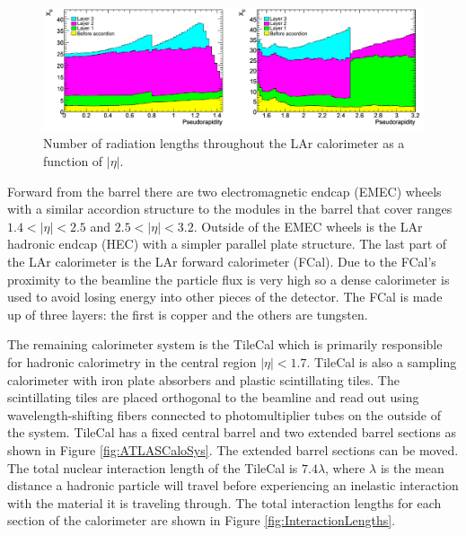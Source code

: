 \begin{figure}[ht!]
	\centering
	\includegraphics[width=\columnwidth]{../ThesisImages/LHCImages/MaterialBudget.png}
	\caption[Number of radiation lengths throughout the LAr calorimeter as a function of $|\eta|$.]{Number of radiation lengths throughout the LAr calorimeter as a function of $|\eta|.$\cite{ATLAS}
	}
	\label{fig:MaterialBudget}
\end{figure}

Forward from the barrel there are two electromagnetic endcap (EMEC) wheels with a similar accordion structure to the modules in the barrel that cover ranges $1.4<|\eta|<2.5$ and $2.5<|\eta|<3.2$.  Outside of the EMEC wheels is the LAr hadronic endcap (HEC) with a simpler parallel plate structure.  The last part of the LAr calorimeter is the LAr forward calorimeter (FCal).  Due to the FCal's proximity to the beamline the particle flux is very high so a dense calorimeter is used to avoid losing energy into other pieces of the detector.  The FCal is made up of three layers: the first is copper and the others are tungsten.  

The remaining calorimeter system is the TileCal which is primarily responsible for hadronic calorimetry in the central region $|\eta|<1.7$.  TileCal is also a sampling calorimeter with iron plate absorbers and plastic scintillating tiles. The scintillating tiles are placed orthogonal to the beamline and read out using wavelength-shifting fibers connected to photomultiplier tubes on the outside of the system.  TileCal has a fixed central barrel and two extended barrel sections as shown in Figure \ref{fig:ATLASCaloSys}.  The extended barrel sections can be moved.  The total nuclear interaction length of the TileCal is $7.4\lambda$, where $\lambda$ is the mean distance a hadronic particle will travel before experiencing an inelastic interaction with the material it is traveling through.  The total interaction lengths for each section of the calorimeter are shown in Figure \ref{fig:InteractionLengths}.


